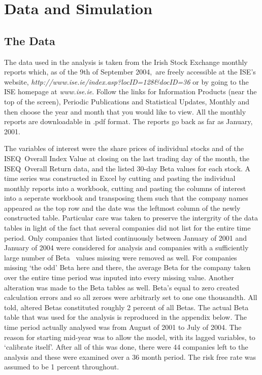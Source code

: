 \documentclass{ucthesis}
\begin{document}
\chapter{Data and Simulation}

\section{The Data}

The data used in the analysis is taken from the Irish Stock Exchange monthly
reports which, as of the 9th of September 2004,\ are freely accessible at
the ISE's website, \textit{http://www.ise.ie/index.asp?locID=128\&docID=36}
or by going to the ISE homepage at \textit{www.ise.ie}. Follow the links for
Information Products (near the top of the screen), Periodic Publications and
Statistical Updates, Monthly and then choose the year and month that you
would like to view. All the monthly reports are downloadable in .pdf format.
The reports go back as far as January, 2001.

The variables of interest were the share prices of individual stocks and of
the ISEQ\ Overall Index Value at closing on the last trading day of the
month, the ISEQ\ Overall Return data, and the listed 30-day Beta values for
each stock. A time series was constructed in Excel by cutting and pasting
the individual monthly reports into a workbook, cutting and pasting the
columns of interest into a seperate workbook and transposing them such that
the company names appeared as the top row and the date was the leftmost
column of the newly constructed table. Particular care was taken to preserve
the intergrity of the data tables in light of the fact that several
companies did not list for the entire time period. Only companies that
listed continuously between January of 2001 and January of 2004 were
considered for analysis and companies with a sufficiently large number of
Beta \ values missing were removed as well. For companies missing `the odd'
Beta here and there, the average Beta for the company taken over the entire
time period was inputed into every missing value. Another alteration was
made to the Beta tables as well. Beta's equal to zero created calculation
errors and so all zeroes were arbitrarly set to one one thousandth. All
told, altered Betas constituted roughly 2 percent of all Betas. The actual
Beta table that was used for the analysis is reproduced in the appendix
below. The time period actually analysed was from August of 2001 to July of
2004. The reason for starting mid-year was to allow the model, with its
lagged variables, to `calibrate itself'. After all of this was done, there
were 44 companies left to the analysis and these were examined over a 36
month period. The risk free rate was assumed to be 1 percent throughout.
\end{document}
